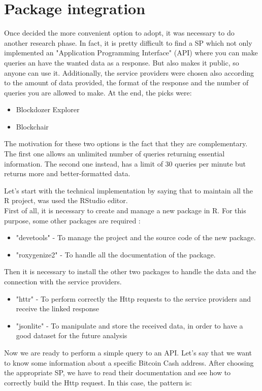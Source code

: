 \section{Package integration}
\label{sec:integration}

Once decided the more convenient option to adopt, it was necessary to do another
research phase. In fact, it is pretty difficult to find a SP which 
not only implemented an "Application Programming Interface" (API) where you can 
make queries an have the wanted data as a response. But also makes it public, 
so anyone can use it. Additionally, the service providers were chosen also 
according to the amount of data provided, the format of the response and the 
number of queries you are allowed to make. At the end, the picks were:
\begin{itemize}
    \item Blockdozer Explorer
    \item Blockchair
\end{itemize} 
The motivation for these two options is the fact that they are complementary.
The first one allows an unlimited number of queries returning essential information.
The second one instead, has a limit of 30 queries per minute but returns more 
and better-formatted data. 

Let's start with the technical implementation by saying that to maintain all the R project, 
was used the RStudio editor.\\ 
First of all, it is necessary to create and manage a new package in R. For this 
purpose, some other packages are required : 
\begin{itemize}
    \item "devetools"   - To manage the project and the source code of the new package.
    \item "roxygenize2" - To handle all the documentation of the package.
\end{itemize}
Then it is necessary to install the other two packages to handle the data and the connection with 
the service providers.
\begin{itemize}
    \item "httr"        - To perform correctly the Http requests to the service providers and receive the linked response
    \item "jsonlite"    - To manipulate and store the received data, in order to have a good dataset for the future analysis
\end{itemize}
Now we are ready to perform a simple query to an API. Let's say that we want to know
some information about a specific Bitcoin Cash address. After choosing the appropriate SP,
we have to read their documentation and see how to correctly build the Http request. 
In this case, the pattern is: \medskip

